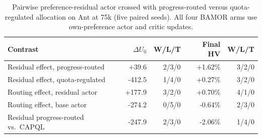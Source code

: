\begin{table}[!htbp]
\centering\small\setlength{\tabcolsep}{4.5pt}
\caption{Pairwise preference-residual actor crossed with progress-routed versus quota-regulated allocation on Ant at 75k (five paired seeds). All four BAMOR arms use own-preference actor and critic updates.}
\label{tab:ant_pairwise}
\begin{tabular}{@{}lrrrr@{}}
\toprule
Contrast & $\Delta U_0$ & W/L/T & Final HV & W/L/T \\
\midrule
Residual effect, progress-routed & +39.6 & 2/3/0 & +1.62\% & 3/2/0 \\
Residual effect, quota-regulated & -412.5 & 1/4/0 & +0.27\% & 3/2/0 \\
Routing effect, residual actor & +177.9 & 3/2/0 & +0.70\% & 4/1/0 \\
Routing effect, base actor & -274.2 & 0/5/0 & -0.64\% & 2/3/0 \\
Residual progress-routed vs.\ CAPQL & -247.9 & 2/3/0 & -2.06\% & 1/4/0 \\
\bottomrule
\end{tabular}
\end{table}
